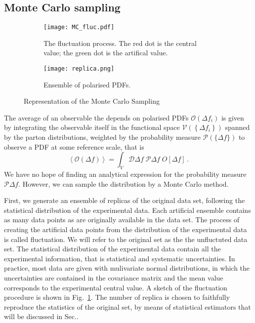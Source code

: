 \subsection{Monte Carlo sampling}
\label{sec:MCS}
\begin{figure}[t]
  \centering
  \begin{subfigure}[b]{0.45\textwidth}
      \centering
      \texttt{[image: MC\_fluc.pdf]}
      \caption{The fluctuation process. The red dot is the central value; the green dot is the artifical value.}
      \label{fig:MC_fluc}
  \end{subfigure}
  \hfill
  \begin{subfigure}[b]{0.45\textwidth}
      \centering
      \texttt{[image: replica.png]}
      \caption{Ensemble of polarised PDFs.}
      \label{fig:PDF_ensemble}
  \end{subfigure}
     \caption{Representation of the Monte Carlo Sampling}
     \label{fig:MC_2_Gr}
\end{figure}
The average of an observable the depends on polarised PDFs $\mathcal{O}(\Delta f_i)$ is given by integrating the observable itself in the functional space $\mathcal{V}\left( \left\{ \Delta f_i \right\}\right)$ spanned by the parton distributions, weighted by the probability measure $\mathcal{P}\left(\{\Delta f\}\right)$ to observe a PDF at some reference scale, that is \cite*{Nocera:2014vla}
\begin{equation}
  \left< \mathcal{O}(\Delta f) \right> = \int_{V} \mathcal{D} \Delta f \; \mathcal{P}{\Delta f} \; O \left[ \Delta f \right] \,.
\end{equation}
We have no hope of finding an analytical expression for the probability measure $\mathcal{P}{\Delta f}$. However, we can sample the distribution by a Monte Carlo method.\par
First, we generate an ensemble of replicas of the original data set, following the statistical distribution of the experimental data. Each artificial ensemble contains as many data points as are originally available in the data set. The process of creating the artificial data points from the distribution of the experimental data is called fluctuation. We will refer to the original set as the the unfluctuted data set. The statistical distribution of the experimental data contain all the experimental information, that is statistical and systematic uncertainties. In practice, most data are given with mulivariate normal distributions, in which the uncertainties are contained in the covariance matrix and the mean value corresponds to the experimental central value. A sketch of the fluctuation procedure is shown in Fig.~\ref{fig:MC_fluc}. The number of replica is chosen to faithfully reproduce the statistics of the original set, by means of statistical estimators that will be discussed in Sec..\par
